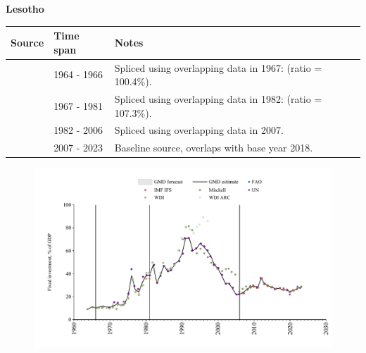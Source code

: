\documentclass[12pt,a4paper,landscape]{article}
\begin{document}
\begin{adjustbox}{max totalsize={\paperwidth}{\paperheight},center}
\begin{minipage}[t][\textheight][t]{\textwidth}
\vspace*{0.5cm}
{}
\begin{center}
{\Large\bfseries Lesotho}
\end{center}
\vspace{0.5cm}
\begin{table}[H]
\centering
\small
\begin{tabular}{|l|l|l|}
\hline
\textbf{Source} & \textbf{Time span} & \textbf{Notes} \\
\hline
\rowcolor{white}\cite{Mitchell}& 1964 - 1966 &Spliced using overlapping data in 1967: (ratio = 100.4\%).\\
\rowcolor{lightgray}\cite{WDI}& 1967 - 1981 &Spliced using overlapping data in 1982: (ratio = 107.3\%).\\
\rowcolor{white}\cite{UN}& 1982 - 2006 &Spliced using overlapping data in 2007.\\
\rowcolor{lightgray}\cite{WDI}& 2007 - 2023 &Baseline source, overlaps with base year 2018.\\
\hline
\end{tabular}
\end{table}
\begin{figure}[H]
\centering
\includegraphics[width=\textwidth,height=0.6\textheight,keepaspectratio]{graphs/LSO_finv_GDP.pdf}
\end{figure}
\end{minipage}
\end{adjustbox}
\end{document}
